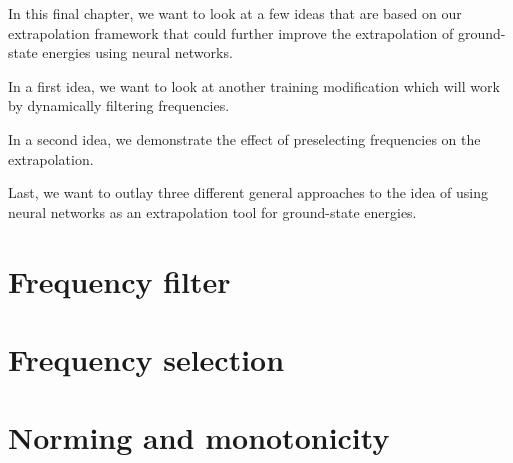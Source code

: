 
In this final chapter, we want to look at a few ideas that are based on our extrapolation framework that could further improve the extrapolation of ground-state energies using neural networks.

In a first idea, we want to look at another training modification which will work by dynamically filtering frequencies.

In a second idea, we demonstrate the effect of preselecting frequencies on the extrapolation.

Last, we want to outlay three different general approaches to the idea of using neural networks as an extrapolation tool for ground-state energies.
\section{Frequency filter}

\section{Frequency selection}

\section{Norming and monotonicity}

